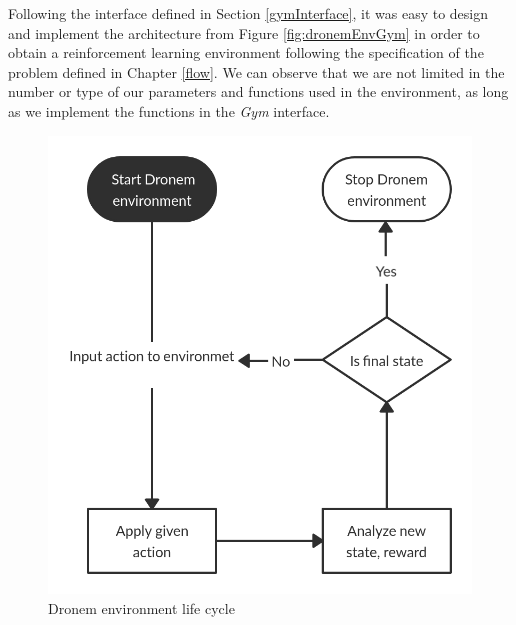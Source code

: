 \par Following the interface defined in Section \ref{gymInterface}, it was easy to design and implement the architecture from Figure \ref{fig:dronemEnvGym} in order to obtain a reinforcement learning environment following the specification of the problem defined in Chapter \ref{flow}. We can observe that we are not limited in the number or type of our parameters and functions used in the environment, as long as we implement the functions in the \emph{Gym} interface.

\begin{figure}[!htb]
    \centering
    \includegraphics[scale=0.3]{Figures/Gym_env_flow.jpg}
    \caption{Dronem environment life cycle}
    \label{fig:dronemEnvPipeline}
\end{figure}{}

